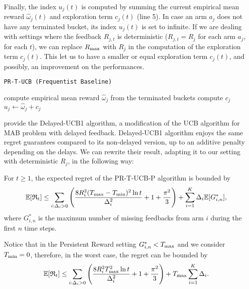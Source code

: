  Finally, the index $u_j(t)$ is computed by summing the current empirical mean reward $\hat{\omega}_j(t) $ and exploration term $c_j(t)$ (line 5). In case an arm $a_j$ does not have any terminated bucket, its index $u_j(t)$ is set to infinite. If we are dealing with settings where the feedback $R_{j,t}$ is deterministic ($R_{j,t}=R_j$ for each arm $a_j$, for each $t$), we can replace $R_{\textnormal{max}}$ with $R_j$ in the computation of the exploration term $c_j(t)$. This let us to have a smaller or equal exploration term $c_j(t)$, and possibly, an improvement on the performances.

\begin{algorithm}[H]
	\caption{\texttt{PR-T-UCB (Frequentist Baseline)}}
	\begin{scriptsize}
		\begin{algorithmic}[1]
			
			\State compute empirical mean reward $\hat{\omega}_j $ from the terminated buckets \;			
			\State compute $c_j$\;
			\State$u_j \gets  \hat{\omega}_j +  c_j$
			\EndFor
			
			\EndFunction
			
		\end{algorithmic}
	\end{scriptsize}
	\label{alg:BaselineUCB}
\end{algorithm}

\cite{joulani2013} provide the Delayed-UCB1 algorithm, a modification of the UCB algorithm for MAB problem with delayed feedback. Delayed-UCB1 algorithm enjoys the same regret guarantees compared to its non-delayed version, up to an additive penalty depending on the delays. We can rewrite their result, adapting it to our setting with deterministic $R_j$, in the following way:

\begin{theorem}
	For $t \ge 1$, the expected regret of the PR-T-UCB-P algorithm is bounded by
	\[ \mathbb{E}[\mathfrak{R}_t] \le \sum_{i:\Delta_i>0} \Bigg( \frac{8 R_i^2 (T_{\textnormal{max}}-T_{\textnormal{min}})^2\ln t }{\Delta_i^2} + 1 + \frac{\pi^2}{3} \Bigg) + \sum_{i=1}^{K} \Delta_i \mathbb{E}[G^*_{i,n}],\]
	where $G^*_{i,n}$ is the maximum number of missing feedbacks from arm $i$ during the first $n$ time steps.
\end{theorem} 
Notice that in the Persistent Reward setting $G^*_{i,n}<T_{\textnormal{max}}$ and we consider $T_{\textnormal{min}} = 0$, therefore, in the worst case, the regret can be bounded by 
\[ \mathbb{E}[\mathfrak{R}_t] \le \sum_{i:\Delta_i>0} \Bigg( \frac{8 R_i^2 T_{\textnormal{max}}^2\ln t}{\Delta_i^2} + 1 + \frac{\pi^2}{3} \Bigg) + T_{\textnormal{max}}\sum_{i=1}^{K} \Delta_i.\]





